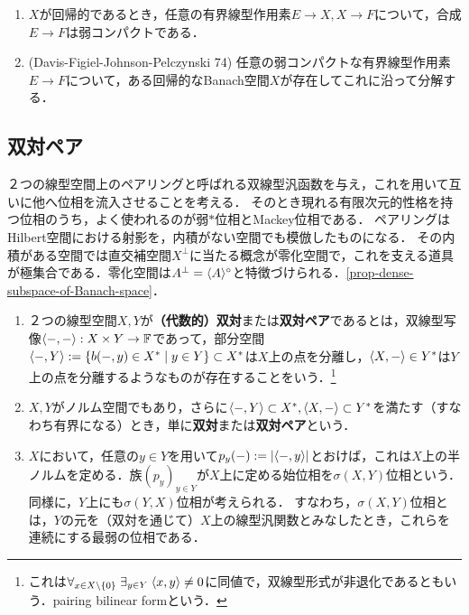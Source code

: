 \documentclass[uplatex,dvipdfmx]{jsreport}
\begin{document}
\begin{corollary}\mbox{}
    \begin{enumerate}
        \item $X$が回帰的であるとき，任意の有界線型作用素$E\to X,X\to F$について，合成$E\to F$は弱コンパクトである．
        \item (Davis-Figiel-Johnson-Pelczynski 74) 任意の弱コンパクトな有界線型作用素$E\to F$について，ある回帰的なBanach空間$X$が存在してこれに沿って分解する．
    \end{enumerate}
\end{corollary}

\subsection{双対ペア}

\begin{tcolorbox}[colframe=ForestGreen, colback=ForestGreen!10!white,breakable,colbacktitle=ForestGreen!40!white,coltitle=black,fonttitle=\bfseries\sffamily,
title=]
    ２つの線型空間上のペアリングと呼ばれる双線型汎函数を与え，これを用いて互いに他へ位相を流入させることを考える．
    そのとき現れる有限次元的性格を持つ位相のうち，よく使われるのが弱$*$位相とMackey位相である．
    ペアリングはHilbert空間における射影を，内積がない空間でも模倣したものになる．
    その内積がある空間では直交補空間$X^\perp$に当たる概念が零化空間で，これを支える道具が極集合である．零化空間は$A^\perp=\langle A\rangle^\circ$と特徴づけられる．\ref{prop-dense-subspace-of-Banach-space}．
\end{tcolorbox}

\begin{definition}\mbox{}
    \begin{enumerate}
        \item ２つの線型空間$X,Y$が\textbf{（代数的）双対}または\textbf{双対ペア}であるとは，双線型写像$\langle-,-\rangle:X\times Y\to\mathbb{F}$であって，部分空間$\langle-,Y\rangle:=\left\{b(-,y)\in X^*\mid y\in Y\right\}\subset X^*$は$X$上の点を分離し，$\langle X,-\rangle\in Y^*$は$Y$上の点を分離するようなものが存在することをいう．\footnote{これは$\forall_{x\in X\setminus\{0\}}\;\exists_{y\in Y}\;\langle x,y\rangle\ne 0$に同値で，双線型形式が非退化であるともいう．pairing bilinear formという．}
        \item $X,Y$がノルム空間でもあり，さらに$\langle-,Y\rangle\subset X^*,\langle X,-\rangle\subset Y^*$を満たす（すなわち有界になる）とき，単に\textbf{双対}または\textbf{双対ペア}という．
        \item $X$において，任意の$y\in Y$を用いて$p_y(-):=\lvert\langle-,y\rangle\rvert$とおけば，これは$X$上の半ノルムを定める．族$(p_y)_{y\in Y}$が$X$上に定める始位相を$\sigma(X,Y)$位相という．同様に，$Y$上にも$\sigma(Y,X)$位相が考えられる．
        すなわち，$\sigma(X,Y)$位相とは，$Y$の元を（双対を通じて）$X$上の線型汎関数とみなしたとき，これらを連続にする最弱の位相である．
    \end{enumerate}
\end{definition}
\end{document}
